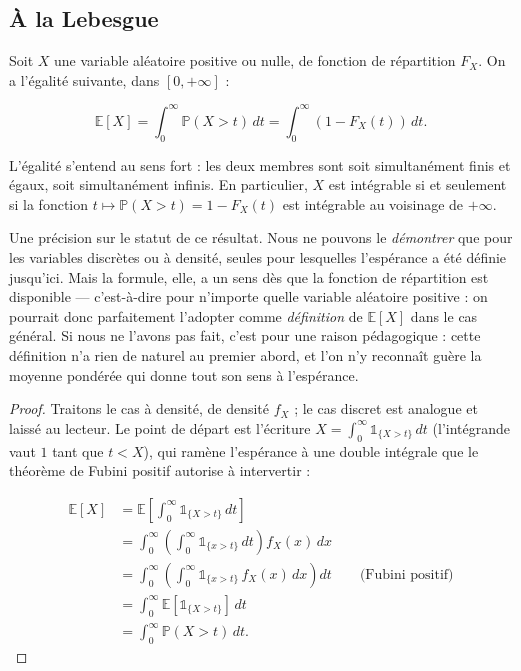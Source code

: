 \subsection{À la Lebesgue}

\begin{mdframed}
\begin{lemme}
Soit $X$ une variable aléatoire positive ou nulle, de fonction de répartition $F_X$. On a l'égalité suivante, dans $[0, +\infty]$ :

$$
\mathbb{E}[X] = \int_0^\infty \mathbb{P}(X > t)\, dt = \int_0^\infty (1 - F_X(t))\, dt.
$$
\end{lemme}
\end{mdframed}

L'égalité s'entend au sens fort : les deux membres sont soit simultanément finis et égaux, soit simultanément infinis. En particulier, $X$ est intégrable si et seulement si la fonction $t \mapsto \mathbb{P}(X > t) = 1 - F_X(t)$ est intégrable au voisinage de $+\infty$.

Une précision sur le statut de ce résultat. Nous ne pouvons le \emph{démontrer} que pour les variables discrètes ou à densité, seules pour lesquelles l'espérance a été définie jusqu'ici. Mais la formule, elle, a un sens dès que la fonction de répartition est disponible — c'est-à-dire pour n'importe quelle variable aléatoire positive : on pourrait donc parfaitement l'adopter comme \emph{définition} de $\mathbb{E}[X]$ dans le cas général. Si nous ne l'avons pas fait, c'est pour une raison pédagogique : cette définition n'a rien de naturel au premier abord, et l'on n'y reconnaît guère la moyenne pondérée qui donne tout son sens à l'espérance.

\begin{proof}
Traitons le cas à densité, de densité $f_X$ ; le cas discret est analogue et laissé au lecteur. Le point de départ est l'écriture $X = \int_0^\infty \mathbb{1}_{\{X > t\}}\, dt$ (l'intégrande vaut $1$ tant que $t < X$), qui ramène l'espérance à une double intégrale que le théorème de Fubini positif autorise à intervertir :

\begin{align*}
\mathbb{E}[X] &= \mathbb{E}\!\left[\int_0^\infty \mathbb{1}_{\{X > t\}}\, dt\right] \\
&= \int_0^\infty \left(\int_0^\infty \mathbb{1}_{\{x > t\}}\, dt\right) f_X(x)\, dx \\
&= \int_0^\infty \left(\int_0^\infty \mathbb{1}_{\{x > t\}}\, f_X(x)\, dx\right) dt \qquad \text{(Fubini positif)} \\
&= \int_0^\infty \mathbb{E}[\mathbb{1}_{\{X > t\}}]\, dt \\
&= \int_0^\infty \mathbb{P}(X > t)\, dt.
\end{align*}
\end{proof}

